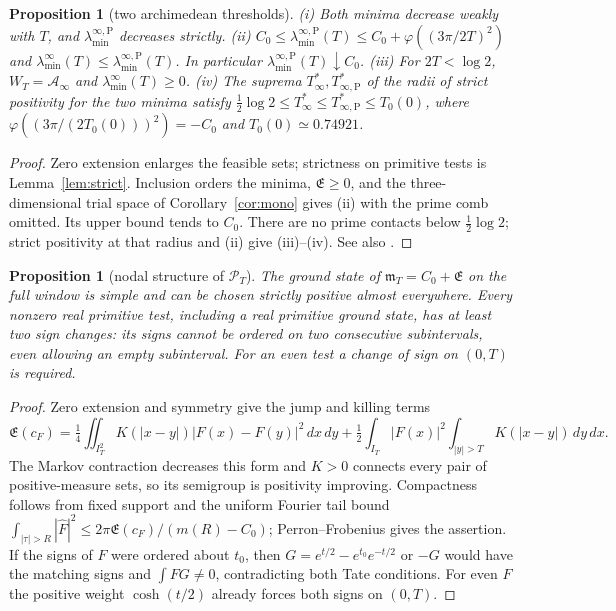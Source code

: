 \documentclass[10pt]{amsart}
\newtheorem{proposition}[theorem]{Proposition}
\theoremstyle{definition}
\theoremstyle{remark}
\newcommand{\PT}{\mathcal P_T}
\newcommand{\IT}{I_T}
\newcommand{\Fh}{\widehat F}
\newcommand{\cF}{c_F}
\newcommand{\Lev}{\mathfrak E}
\newcommand{\Ainf}{\mathcal A_\infty}
\newcommand{\mT}{\mathfrak m_T}
\newcommand{\laminf}{\lambda^{\infty}_{\min}}
\newcommand{\laminfP}{\lambda^{\infty,\mathrm P}_{\min}}
\begin{document}
\begin{proposition}[two archimedean thresholds]\label{prop:arch}
(i) Both minima decrease weakly with $T$, and $\laminfP$ decreases strictly.
(ii) $C_0\le\laminfP(T)\le C_0+\varphi((3\pi/2T)^2)$ and
$\laminf(T)\le\laminfP(T)$. In particular $\laminfP(T)\downarrow C_0$.
(iii) For $2T<\log2$, $W_T=\Ainf$ and $\laminf(T)\ge0$.
(iv) The suprema $T^*_\infty,T^*_{\infty,\mathrm P}$ of the radii of
strict positivity for the two minima satisfy
$\tfrac12\log2\le T^*_\infty\le T^*_{\infty,\mathrm P}\le T_0(0)$,
where $\varphi((3\pi/(2T_0(0)))^2)=-C_0$ and $T_0(0)\simeq0.74921$.
\end{proposition}
\begin{proof}
Zero extension enlarges the feasible sets; strictness on primitive tests
is Lemma~\ref{lem:strict}. Inclusion orders the minima, $\Lev\ge0$,
and the three-dimensional trial space of Corollary~\ref{cor:mono}
gives (ii) with the prime comb omitted. Its upper bound tends to $C_0$.
There are no prime contacts below $\tfrac12\log2$; strict positivity
at that radius \cite{Yoshida1992} and (ii) give (iii)--(iv).
See also \cite{Bombieri2000,ConnesConsani2021,Zhu2026}.
\end{proof}

\begin{proposition}[nodal structure of $\PT$]\label{prop:nodes}
The ground state of $\mT=C_0+\Lev$ on the full window is simple and can
be chosen strictly positive almost everywhere. Every nonzero real primitive
test, including a real primitive ground state, has at least two sign changes:
its signs cannot be ordered on two consecutive subintervals, even allowing an
empty subinterval. For an even test a change of sign on $(0,T)$ is required.
\end{proposition}
\begin{proof}
Zero extension and symmetry give the jump and killing terms
\[
 \Lev(\cF)=\tfrac14\iint_{\IT^2}K(|x-y|)|F(x)-F(y)|^2\,dx\,dy
 +\tfrac12\int_{\IT}|F(x)|^2\!\int_{|y|>T}K(|x-y|)\,dy\,dx.
\]
The Markov contraction decreases this form and $K>0$ connects every
pair of positive-measure sets, so its semigroup is positivity improving.
Compactness follows from fixed support and the uniform Fourier tail
bound $\int_{|\tau|>R}|\Fh|^2\le2\pi\Lev(\cF)/(m(R)-C_0)$;
Perron--Frobenius gives the assertion. If the signs of $F$ were
ordered about $t_0$, then $G=e^{t/2}-e^{t_0}e^{-t/2}$ or $-G$
would have the matching signs and $\int FG\ne0$, contradicting
both Tate conditions. For even $F$ the positive weight $\cosh(t/2)$
already forces both signs on $(0,T)$.
\end{proof}
\end{document}
